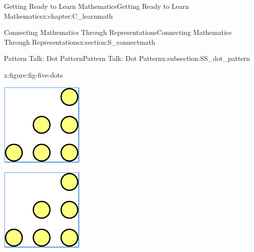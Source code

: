 \documentclass[oneside,10pt,]{book}
\numberwithin{equation}{chapter}
\begin{document}
\begin{chapterptx}{Getting Ready to Learn Mathematics}{}{Getting Ready to Learn Mathematics}{}{}{x:chapter:C_learnmath}
\begin{sectionptx}{Connecting Mathematics Through Representations}{}{Connecting Mathematics Through Representations}{}{}{x:section:S_connectmath}
\begin{subsectionptx}{Pattern Talk: Dot Pattern}{}{Pattern Talk: Dot Pattern}{}{}{x:subsection:SS_dot_pattern}
\begin{figureptx}{}{x:figure:fig-five-dots}{}
\begin{sidebyside}{5}{0.015}{0.015}{0.03}
\begin{sbspanel}{0.17}
\includegraphics[width=\linewidth]{external/tri-dots.pdf}
\end{sbspanel}%
\begin{sbspanel}{0.17}%
\includegraphics[width=\linewidth]{external/tri-dots.pdf}

\end{sbspanel}
\end{sidebyside}
\end{figureptx}
\end{subsectionptx}
\end{sectionptx}
\end{chapterptx}
\end{document}
